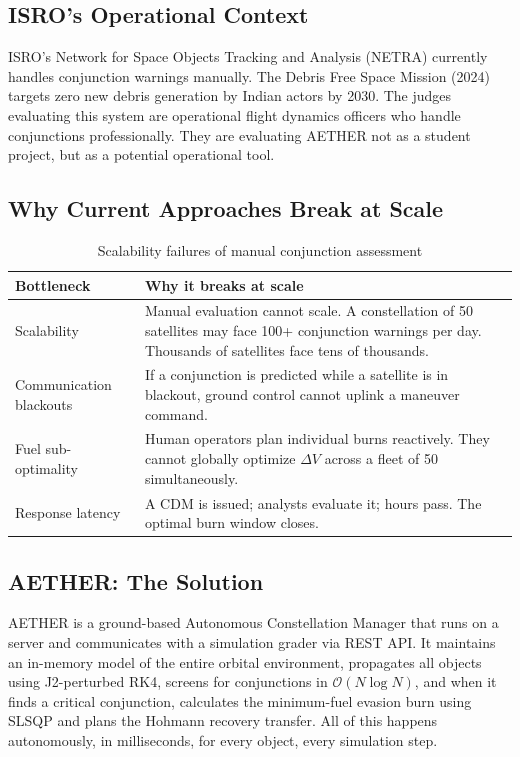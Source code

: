 \documentclass[12pt,a4paper]{article}
\begin{document}
\subsection{ISRO's Operational Context}

ISRO's Network for Space Objects Tracking and Analysis (NETRA) currently handles conjunction warnings manually. The Debris Free Space Mission (2024) targets zero new debris generation by Indian actors by 2030. The judges evaluating this system are operational flight dynamics officers who handle conjunctions professionally. They are evaluating AETHER not as a student project, but as a potential operational tool.

\subsection{Why Current Approaches Break at Scale}

\begin{table}[H]
\centering
\caption{Scalability failures of manual conjunction assessment}
\begin{tabular}{lp{8cm}}
\toprule
\textbf{Bottleneck} & \textbf{Why it breaks at scale} \\
\midrule
Scalability & Manual evaluation cannot scale. A constellation of 50 satellites may face 100+ conjunction warnings per day. Thousands of satellites face tens of thousands. \\
Communication blackouts & If a conjunction is predicted while a satellite is in blackout, ground control cannot uplink a maneuver command. \\
Fuel sub-optimality & Human operators plan individual burns reactively. They cannot globally optimize $\Delta V$ across a fleet of 50 simultaneously. \\
Response latency & A CDM is issued; analysts evaluate it; hours pass. The optimal burn window closes. \\
\bottomrule
\end{tabular}
\end{table}

\subsection{AETHER: The Solution}

AETHER is a ground-based Autonomous Constellation Manager that runs on a server and communicates with a simulation grader via REST API. It maintains an in-memory model of the entire orbital environment, propagates all objects using J2-perturbed RK4, screens for conjunctions in $\mathcal{O}(N \log N)$, and when it finds a critical conjunction, calculates the minimum-fuel evasion burn using SLSQP and plans the Hohmann recovery transfer. All of this happens autonomously, in milliseconds, for every object, every simulation step.
\end{document}
